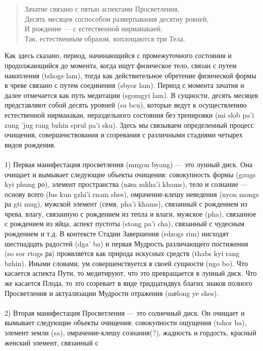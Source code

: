 \begin{verse}
Зачатие связано с пятью аспектами Просветления,\\
Десять месяцев соспособом развертывания десятиу ровней,\\
И рождение — с естественной нирманакаей;\\
Так, естественным образом, воплощаются три Тела.
\end{verse}

Как здесь сказано, период, начинающийся с промежуточного состояния и
продолжающийся до момента, когда ищут физическое тело, связан с путем накопления
(tshogs lam), тогда как действительное обретение физической формы в чреве связано с путем
соединения (sbyor lam). Период с момента зачатия и далее отмечается как путь медитации
(sgomgyi lam). В сущности, десять месяцев представляют собой десять уровней (sa bcu),
которые ведут к осуществлению естественной нирманакаи, нераздельного состояния без
тренировки (mi slob pa'i zung 'jug rang bzhin sprul pa'i sku).
Здесь мы связываем определенный процесс очищения, совершенствования и
созревания с различными стадиями четырех видов рождения.\\
\\
1) Первая манифестация просветления (mngon byang) — это лунный диск. Она
очищает и вымывает следующие объекты очищения: совокупность формы (gzugs kyi phung
ро), элемент пространства (nаm mkha'i khams), тело и сознание — основу всего (lus kun gzhi'i
rnam shes), омрачение-клешу неведения (nyon mongs ра gti mug), мужской элемент (семя,
pha'i khams), связанный с рождением из чрева, влагу, связанную с рождением из тепла и
влаги, мужское (pha), связанное с рождением из яйца, аспект пустоты (stong pa'i cha),
связанный с чудесным рождением и т.д. В контексте Стадии Завершения (rdzogs rim)
нисходят шестнадцать радостей (dga' ba) и первая Мудрость различающего постижения (so
sor rtogs ра) проявляется как природа искусных средств (thabs kyi rang bzhin). Иными
словами, ум совершенствуется в своей сущности (ngo bo). Что касается аспекта Пути, то
медитируют, что это превращается в лунный диск. Что же касается Плода, то это созревает в
виде тридцатидвух благих знаков полного Просветления и актуализации Мудрости
отражения (mеlong ye shes).\\
\\
2) Вторая манифестация Просветления — это солнечный диск. Он очищает и вымывает
следующие объекты очищения: совокупности ощущения (tshor ba), элемент земли (sa),
омрачение-клешу сознания(?), жадность и гордость, красный женский элемент, связанный с
